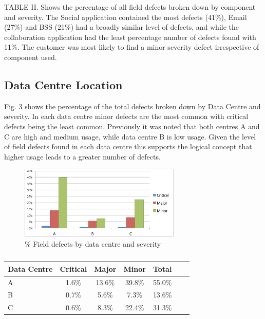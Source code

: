 \documentclass[conference]{IEEEtran}
\begin{document}
TABLE II. Shows the percentage of all field defects broken down by component and severity. The Social application contained the most defects (41\%), Email (27\%) and BSS (21\%) had a broadly similar level of defects, and while the collaboration application had the least percentage number of defects found with 11\%.  The customer was most likely to find a minor severity defect irrespective of component used.

\subsection{Data Centre Location}

Fig. 3 shows the percentage of the total defects broken down by Data Centre and severity. In each data centre minor defects are the most common with critical defects being the least common. Previously it was noted that both centres A and C are high and medium usage, while data centre B is low usage. Given the level of field defects found in each data centre this supports the logical concept that higher usage leads to a greater number of defects.

\begin{figure}
\begin{center}
\includegraphics[height=3.5cm]{graphs/graph3.pdf} 
\caption{\% Field defects by data centre and severity}
\end{center}
\label{fig:defectdatacentre}
\end{figure}

\begin {table}
\caption {}
\begin{center}
\begin{tabular}{l*{5}{c}r} Data Centre & Critical & Major & Minor &  Total \\ \hline A & 1.6\%	 & 13.6\%	& 39.8\%	& 55.0\% \\ B & 0.7\% & 5.6\% & 7.3\% & 13.6\% \\ C	& 0.6\% & 8.3\% & 22.4\%	 & 31.3\%   \end{tabular}
\end{center}
\end{table}
\end{document}
